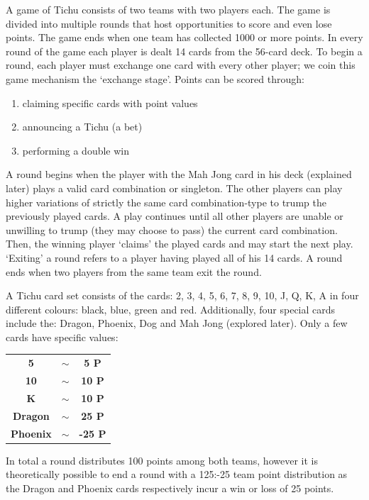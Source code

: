 A game of Tichu consists of two teams with two players each. The game is divided into multiple rounds that host opportunities to score and even lose points. The game ends when one team has collected 1000 or more points. In every round of the game each player is dealt 14 cards from the 56-card deck. To begin a round, each player must exchange one card with every other player; we coin this game mechanism the ‘exchange stage’. Points can be scored through:\\
\begin{enumerate}
\item claiming specific cards with point values
\item announcing a Tichu (a bet)
\item performing a double win
\end{enumerate}

A round begins when the player with the Mah Jong card in his deck (explained later) plays a valid card combination or singleton. The other players can play higher variations of strictly the same card combination-type to trump the previously played cards. A play continues until all other players are unable or unwilling to trump (they may choose to pass) the current card combination. Then, the winning player ‘claims’ the played cards and may start the next play. ‘Exiting’ a round refers to a player having played all of his 14 cards. A round ends when two players from the same team exit the round.


A Tichu card set consists of the cards: 2, 3, 4, 5, 6, 7, 8, 9, 10, J, Q, K, A in four different colours: black, blue, green and red. Additionally, four special cards include the: Dragon, Phoenix, Dog and Mah Jong (explored later). Only a few cards have specific values:\\
\begin{scriptsize}
\begin{center}
\begin{tabular}{ c c c }
\textbf{5} & $\sim$  & \textbf{5 P} \\
\textbf{10} & $\sim$ & \textbf{10 P} \\
\textbf{K} & $\sim$  & \textbf{10 P} \\
\textbf{Dragon} & $\sim$ & \textbf{25 P} \\
\textbf{Phoenix} & $\sim$ & \textbf{-25 P}
\end{tabular}
\end{center}
\end{scriptsize}
In total a round distributes 100 points among both teams, however it is theoretically possible to end a round with a 125:-25 team point distribution as the Dragon and Phoenix cards respectively incur a win or loss of 25 points.


